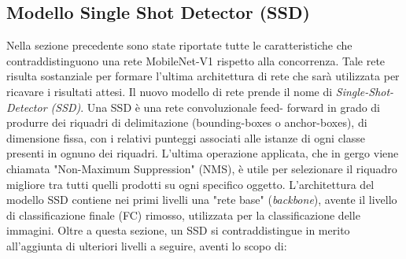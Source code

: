 \subsection{Modello Single Shot Detector (SSD)}
Nella sezione precedente sono state riportate tutte le caratteristiche che 
contraddistinguono una rete MobileNet-V1 rispetto alla concorrenza. Tale 
rete risulta sostanziale per formare l'ultima architettura di rete che sarà 
utilizzata per ricavare i risultati attesi. Il nuovo modello di rete prende il 
nome di \emph{Single-Shot-Detector (SSD)}\cite{SSD_single_shot_detector}. Una SSD è una rete convoluzionale feed-
forward in grado di produrre dei riquadri di delimitazione (bounding-boxes
 o anchor-boxes), di dimensione fissa, con i relativi punteggi associati alle 
istanze di ogni classe presenti in ognuno dei riquadri. L'ultima operazione 
applicata, che in gergo viene chiamata "Non-Maximum Suppression" (NMS), 
è utile per selezionare il riquadro migliore tra tutti quelli prodotti su ogni 
specifico oggetto. L'architettura del modello SSD contiene nei primi livelli 
una "rete base" (\emph{backbone}), avente il livello di classificazione finale (FC) 
rimosso, utilizzata per la classificazione delle immagini. Oltre a questa 
sezione, un SSD si contraddistingue in merito all'aggiunta di ulteriori livelli 
a seguire, aventi lo scopo di:
